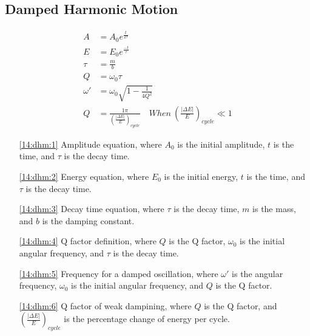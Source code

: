 \documentclass{subfiles}
\begin{document}
\subsection{Damped Harmonic Motion}

\begin{align}
	A &=A_{0}e^{\frac{t}{2\tau}} \label{14:dhm:1}\\
	E &= E_{0}e^{\frac{-t}{\tau}} \label{14:dhm:2}\\
	\tau &= \frac{m}{b} \label{14:dhm:3}\\
	Q &= \omega_{0}\tau \label{14:dhm:4}\\
	\omega ' &= \omega_{0}\sqrt{1-\frac{1}{4Q^{2}}} \label{14:dhm:5}\\
	Q &= \frac{1\pi}{\left( \frac{\left| \Delta E \right|}{E} \right)_{cycle}}\quad When\ \left(\frac{\left| \Delta E \right|}{E}\right)_{cycle} \ll 1 \label{14:dhm:6}
\end{align}

\begin{enumerate}
	\item[\eqref{14:dhm:1}] Amplitude equation, where $A_{0}$ is the initial amplitude, $t$ is the time, and $\tau$ is the decay time.
	\item[\eqref{14:dhm:2}] Energy equation, where $E_{0}$ is the initial energy, $t$ is the time, and $\tau$ is the decay time.
	\item[\eqref{14:dhm:3}] Decay time equation, where $\tau$ is the decay time, $m$ is the mass, and $b$ is the damping constant.
	\item[\eqref{14:dhm:4}] Q factor definition, where $Q$ is the Q factor, $\omega_{0}$ is the initial angular frequency, and $\tau$ is the decay time.
	\item[\eqref{14:dhm:5}] Frequency for a damped oscillation, where $\omega '$ is the angular frequency, $\omega_{0}$ is the initial angular frequency, and $Q$ is the Q factor.
	\item[\eqref{14:dhm:6}] Q factor of weak dampining, where $Q$ is the Q factor, and $\left( \frac{\left| \Delta E \right|}{E} \right)_{cycle}$ is the percentage change of energy per cycle.
\end{enumerate}
\end{document}
